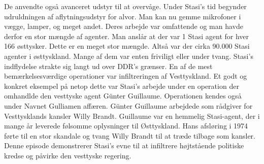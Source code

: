 De anvendte også avanceret udstyr til at overvåge. Under Stasi's tid begynder udruldningen af aflytningsudstyr for alvor. Man kan nu gemme mikrofoner i vægge, lamper, og meget andet. Deres arbejde var omfattende og man havde derfor en stor mængde af agenter. Man anslår at der var 1 Stasi agent for hver 166 østtysker. Dette er en meget stor mængde. Altså var der cirka 90.000 Stasi agenter i østtyskland. Mange af dem var enten friviligt eller under tvang. Stasi's indflydelse strakte sig langt ud over DDR's grænser. En af de mest bemærkelsesværdige operationer var infiltreringen af Vesttyskland. Et godt og konkret eksempel på netop dette var Stasi's arbejde under en operation der omhandlde den vesttyske agent Günter Guillaume. Operationen kendes også under Navnet Gulliamen affæren. Günter Guillaume arbejdede som rådgiver for Vesttysklands kansler Willy Brandt. Guillaume var en hemmelig Stasi-agent, der i mange år leverede følsomme oplysninger til Østtyskland. Hans afsløring i 1974 førte til en stor skandale og tvang Willy Brandt til at træde tilbage som kansler. Denne episode demonstrerer Stasi's evne til at infiltrere højtstående politiske kredse og påvirke den vesttyske regering. %

